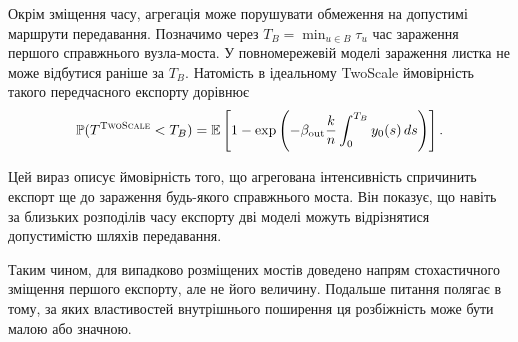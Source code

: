 \documentclass[a4paper,fleqn]{cas-sc}
\newcommand{\TS}{\textup{\textsc{TwoScale}}}
\begin{document}
Окрім зміщення часу, агрегація може порушувати обмеження на допустимі маршрути передавання. Позначимо через
$T_B=\min_{u\in B}\tau_u$ час зараження першого справжнього вузла-моста. У повномережевій моделі зараження листка не може відбутися раніше за $T_B$. Натомість в ідеальному TwoScale ймовірність такого передчасного експорту дорівнює
\begin{equation}
\label{eq:bypass}
\mathbb{P}(T^{\TS}<T_B)
=
\mathbb{E}\left[
1-\exp\left(
-\beta_{\mathrm{out}}\frac{k}{n}
\int_0^{T_B}y_0(s)\,ds
\right)
\right].
\end{equation}

Цей вираз описує ймовірність того, що агрегована інтенсивність спричинить експорт ще до зараження будь-якого справжнього моста. Він показує, що навіть за близьких розподілів часу експорту дві моделі можуть відрізнятися допустимістю шляхів передавання.

Таким чином, для випадково розміщених мостів доведено напрям стохастичного зміщення першого експорту, але не його величину. Подальше питання полягає в тому, за яких властивостей внутрішнього поширення ця розбіжність може бути малою або значною.




\end{document}

